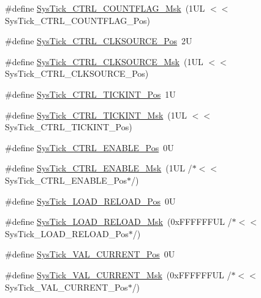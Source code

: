 \begin{DoxyCompactItemize}
\item 
\#define \hyperlink{group___c_m_s_i_s___sys_tick_ga1bf3033ecccf200f59baefe15dbb367c}{Sys\+Tick\+\_\+\+C\+T\+R\+L\+\_\+\+C\+O\+U\+N\+T\+F\+L\+A\+G\+\_\+\+Msk}~(1\+U\+L $<$$<$ Sys\+Tick\+\_\+\+C\+T\+R\+L\+\_\+\+C\+O\+U\+N\+T\+F\+L\+A\+G\+\_\+\+Pos)
\item 
\#define \hyperlink{group___c_m_s_i_s___sys_tick_ga24fbc69a5f0b78d67fda2300257baff1}{Sys\+Tick\+\_\+\+C\+T\+R\+L\+\_\+\+C\+L\+K\+S\+O\+U\+R\+C\+E\+\_\+\+Pos}~2U
\item 
\#define \hyperlink{group___c_m_s_i_s___sys_tick_gaa41d06039797423a46596bd313d57373}{Sys\+Tick\+\_\+\+C\+T\+R\+L\+\_\+\+C\+L\+K\+S\+O\+U\+R\+C\+E\+\_\+\+Msk}~(1\+U\+L $<$$<$ Sys\+Tick\+\_\+\+C\+T\+R\+L\+\_\+\+C\+L\+K\+S\+O\+U\+R\+C\+E\+\_\+\+Pos)
\item 
\#define \hyperlink{group___c_m_s_i_s___sys_tick_ga88f45bbb89ce8df3cd2b2613c7b48214}{Sys\+Tick\+\_\+\+C\+T\+R\+L\+\_\+\+T\+I\+C\+K\+I\+N\+T\+\_\+\+Pos}~1U
\item 
\#define \hyperlink{group___c_m_s_i_s___sys_tick_ga95bb984266ca764024836a870238a027}{Sys\+Tick\+\_\+\+C\+T\+R\+L\+\_\+\+T\+I\+C\+K\+I\+N\+T\+\_\+\+Msk}~(1\+U\+L $<$$<$ Sys\+Tick\+\_\+\+C\+T\+R\+L\+\_\+\+T\+I\+C\+K\+I\+N\+T\+\_\+\+Pos)
\item 
\#define \hyperlink{group___c_m_s_i_s___sys_tick_ga0b48cc1e36d92a92e4bf632890314810}{Sys\+Tick\+\_\+\+C\+T\+R\+L\+\_\+\+E\+N\+A\+B\+L\+E\+\_\+\+Pos}~0U
\item 
\#define \hyperlink{group___c_m_s_i_s___sys_tick_ga16c9fee0ed0235524bdeb38af328fd1f}{Sys\+Tick\+\_\+\+C\+T\+R\+L\+\_\+\+E\+N\+A\+B\+L\+E\+\_\+\+Msk}~(1\+U\+L /$\ast$$<$$<$ Sys\+Tick\+\_\+\+C\+T\+R\+L\+\_\+\+E\+N\+A\+B\+L\+E\+\_\+\+Pos$\ast$/)
\item 
\#define \hyperlink{group___c_m_s_i_s___sys_tick_gaf44d10df359dc5bf5752b0894ae3bad2}{Sys\+Tick\+\_\+\+L\+O\+A\+D\+\_\+\+R\+E\+L\+O\+A\+D\+\_\+\+Pos}~0U
\item 
\#define \hyperlink{group___c_m_s_i_s___sys_tick_ga265912a7962f0e1abd170336e579b1b1}{Sys\+Tick\+\_\+\+L\+O\+A\+D\+\_\+\+R\+E\+L\+O\+A\+D\+\_\+\+Msk}~(0x\+F\+F\+F\+F\+F\+F\+U\+L /$\ast$$<$$<$ Sys\+Tick\+\_\+\+L\+O\+A\+D\+\_\+\+R\+E\+L\+O\+A\+D\+\_\+\+Pos$\ast$/)
\item 
\#define \hyperlink{group___c_m_s_i_s___sys_tick_ga3208104c3b019b5de35ae8c21d5c34dd}{Sys\+Tick\+\_\+\+V\+A\+L\+\_\+\+C\+U\+R\+R\+E\+N\+T\+\_\+\+Pos}~0U
\item 
\#define \hyperlink{group___c_m_s_i_s___sys_tick_gafc77b56d568930b49a2474debc75ab45}{Sys\+Tick\+\_\+\+V\+A\+L\+\_\+\+C\+U\+R\+R\+E\+N\+T\+\_\+\+Msk}~(0x\+F\+F\+F\+F\+F\+F\+U\+L /$\ast$$<$$<$ Sys\+Tick\+\_\+\+V\+A\+L\+\_\+\+C\+U\+R\+R\+E\+N\+T\+\_\+\+Pos$\ast$/)
$$
\end{DoxyCompactItemize}

